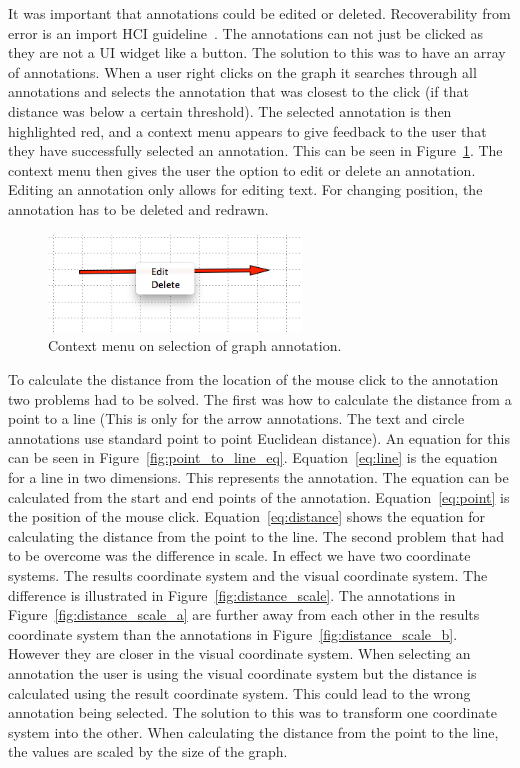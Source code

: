 It was important that annotations could be edited or deleted.  Recoverability from error is an import \ac{HCI} guideline~\cite{shgold}\cite{normsev}\cite{neilten}.  The annotations can not just be clicked as they are not a \ac{UI} widget like a button.  The solution to this was to have an array of annotations.  When a user right clicks on the graph it searches through all annotations and selects the annotation that was closest to the click (if that distance was below a certain threshold).  The selected annotation is then highlighted red, and a context menu appears to give feedback to the user that they have successfully selected an annotation.  This can be seen in Figure~\ref{fig:annotation_selection}.  The context menu then gives the user the option to edit or delete an annotation.  Editing an annotation only allows for editing text.  For changing position, the annotation has to be deleted and redrawn.

\begin{figure}[h!]
    \centering
    \includegraphics[width=0.6\textwidth]{images/annotation_selection.png}
    \caption{Context menu on selection of graph annotation.}
    \label{fig:annotation_selection}
\end{figure}

To calculate the distance from the location of the mouse click to the annotation two problems had to be solved.  The first was how to calculate the distance from a point to a line (This is only for the arrow annotations.  The text and circle annotations use standard point to point Euclidean distance).  An equation for this can be seen in Figure~\ref{fig:point_to_line_eq}.  Equation~\ref{eq:line} is the equation for a line in two dimensions.  This represents the annotation.  The equation can be calculated from the start and end points of the annotation. Equation~\ref{eq:point} is the position of the mouse click.  Equation~\ref{eq:distance} shows the equation for calculating the distance from the point to the line.  The second problem that had to be overcome was the difference in scale.  In effect we have two coordinate systems.  The results coordinate system and the visual coordinate system.  The difference is illustrated in Figure~\ref{fig:distance_scale}.  The annotations in Figure~\ref{fig:distance_scale_a} are further away from each other in the results coordinate system than the annotations in Figure~\ref{fig:distance_scale_b}. However they are closer in the visual coordinate system.  When selecting an annotation the user is using the visual coordinate system but the distance is calculated using the result coordinate system.  This could lead to the wrong annotation being selected.  The solution to this was to transform one coordinate system into the other.  When calculating the distance from the point to the line, the values are scaled by the size of the graph.

